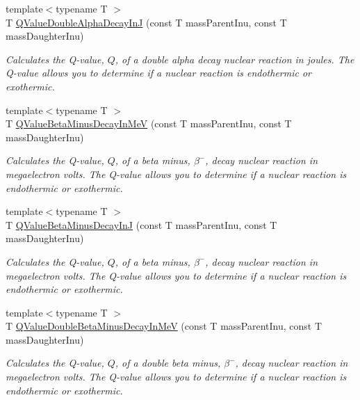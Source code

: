 \begin{DoxyCompactItemize}
{\footnotesize template$<$typename T $>$ }\\T \mbox{\hyperlink{group___e_g_x_phys-_q_value-_alpha_ga015ade04346d0c6dae4dda8e3aab8cbd}{Q\+Value\+Double\+Alpha\+Decay\+InJ}} (const T mass\+Parent\+Inu, const T mass\+Daughter\+Inu)
\begin{DoxyCompactList}\small\item\em Calculates the Q-\/value, $Q$, of a double alpha decay nuclear reaction in joules. The Q-\/value allows you to determine if a nuclear reaction is endothermic or exothermic. \end{DoxyCompactList}\item 
{\footnotesize template$<$typename T $>$ }\\T \mbox{\hyperlink{group___e_g_x_phys-_q_value-_beta_minus_gaac1374ce9ba39bef416f34298708bda9}{Q\+Value\+Beta\+Minus\+Decay\+In\+MeV}} (const T mass\+Parent\+Inu, const T mass\+Daughter\+Inu)
\begin{DoxyCompactList}\small\item\em Calculates the Q-\/value, $Q$, of a beta minus, $\beta^-$, decay nuclear reaction in megaelectron volts. The Q-\/value allows you to determine if a nuclear reaction is endothermic or exothermic. \end{DoxyCompactList}\item 
{\footnotesize template$<$typename T $>$ }\\T \mbox{\hyperlink{group___e_g_x_phys-_q_value-_beta_minus_gae9a4a9f4c6e0f555e20c3144dd7329fc}{Q\+Value\+Beta\+Minus\+Decay\+InJ}} (const T mass\+Parent\+Inu, const T mass\+Daughter\+Inu)
\begin{DoxyCompactList}\small\item\em Calculates the Q-\/value, $Q$, of a beta minus, $\beta^-$, decay nuclear reaction in megaelectron volts. The Q-\/value allows you to determine if a nuclear reaction is endothermic or exothermic. \end{DoxyCompactList}\item 
{\footnotesize template$<$typename T $>$ }\\T \mbox{\hyperlink{group___e_g_x_phys-_q_value-_beta_minus_ga2678563115405a056c6bdccc9f2a9232}{Q\+Value\+Double\+Beta\+Minus\+Decay\+In\+MeV}} (const T mass\+Parent\+Inu, const T mass\+Daughter\+Inu)
\begin{DoxyCompactList}\small\item\em Calculates the Q-\/value, $Q$, of a double beta minus, $\beta^-$, decay nuclear reaction in megaelectron volts. The Q-\/value allows you to determine if a nuclear reaction is endothermic or exothermic. \end{DoxyCompactList}\item 

\end{DoxyCompactItemize}
